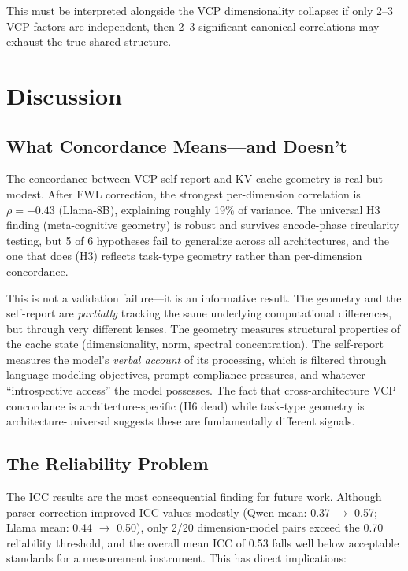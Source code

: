 \documentclass[11pt,a4paper]{article}
\begin{document}
This must be interpreted alongside the VCP dimensionality collapse: if only 2--3 VCP factors are independent, then 2--3 significant canonical correlations may exhaust the true shared structure.

\section{Discussion}

\subsection{What Concordance Means---and Doesn't}

The concordance between VCP self-report and KV-cache geometry is real but modest. After FWL correction, the strongest per-dimension correlation is $\rho = -0.43$ (Llama-8B), explaining roughly 19\% of variance. The universal H3 finding (meta-cognitive geometry) is robust and survives encode-phase circularity testing, but 5 of 6 hypotheses fail to generalize across all architectures, and the one that does (H3) reflects task-type geometry rather than per-dimension concordance.

This is not a validation failure---it is an informative result. The geometry and the self-report are \emph{partially} tracking the same underlying computational differences, but through very different lenses. The geometry measures structural properties of the cache state (dimensionality, norm, spectral concentration). The self-report measures the model's \emph{verbal account} of its processing, which is filtered through language modeling objectives, prompt compliance pressures, and whatever ``introspective access'' the model possesses. The fact that cross-architecture VCP concordance is architecture-specific (H6 dead) while task-type geometry is architecture-universal suggests these are fundamentally different signals.

\subsection{The Reliability Problem}

The ICC results are the most consequential finding for future work. Although parser correction improved ICC values modestly (Qwen mean: 0.37 $\to$ 0.57; Llama mean: 0.44 $\to$ 0.50), only 2/20 dimension-model pairs exceed the 0.70 reliability threshold, and the overall mean ICC of 0.53 falls well below acceptable standards for a measurement instrument. This has direct implications:
\end{document}
